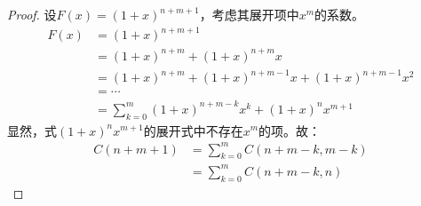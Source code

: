 \begin{proof}
    设$F(x)=(1+x)^{n+m+1}$，考虑其展开项中$x^m$的系数。
    \begin{align*}
        F(x) &= (1+x)^{n+m+1}\\
            &= (1+x)^{n+m} + (1+x)^{n+m}x\\
            &= (1+x)^{n+m} + (1+x)^{n+m-1}x + (1+x)^{n+m-1}x^2\\
            &= \cdots\\
            &= \sum_{k=0}^m (1+x)^{n+m-k}x^k + (1+x)^{n}x^{m+1}
    \end{align*}
    显然，式$(1+x)^{n}x^{m+1}$的展开式中不存在$x^m$的项。故：
    \begin{align*}
        C(n+m+1) &= \sum_{k=0}^m C(n+m-k,m-k)\\
                &= \sum_{k=0}^m C(n+m-k,n)
    \end{align*}
\end{proof}